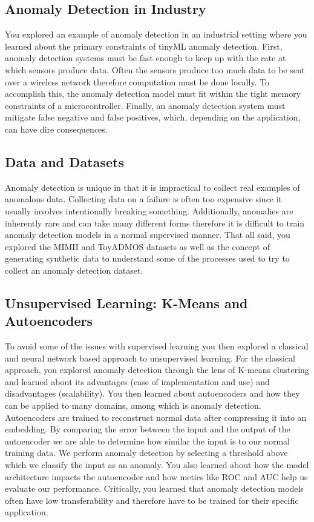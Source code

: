 \subsection{Anomaly Detection in Industry}

You explored an example of anomaly detection in an industrial setting where you learned about the primary constraints of tinyML anomaly detection. First, anomaly detection systems must be fast enough to keep up with the rate at which sensors produce data. Often the sensors produce too much data to be sent over a wireless network therefore computation must be done locally. To accomplish this, the anomaly detection model must fit within the tight memory constraints of a microcontroller. Finally, an anomaly detection system must mitigate false negative and false positives, which, depending on the application, can have dire consequences. 

\subsection{Data and Datasets}

Anomaly detection is unique in that it is impractical to collect real examples of anomalous data. Collecting data on a failure is often too expensive since it usually involves intentionally breaking something. Additionally, anomalies are inherently rare and can take many different forms therefore it is difficult to train anomaly detection models in a normal supervised manner. That all said, you explored the MIMII and ToyADMOS datasets as well as the concept of generating synthetic data to understand some of the processes used to try to collect an anomaly detection dataset.

\subsection{Unsupervised Learning: K-Means and Autoencoders}

To avoid some of the issues with supervised learning you then explored a classical and neural network based approach to unsupervised learning. For the classical approach, you explored anomaly detection through the lens of K-means clustering and learned about its advantages (ease of implementation and use) and disadvantages (scalability). You then learned about autoencoders and how they can be applied to many domains, among which is anomaly detection. Autoencoders are trained to reconstruct normal data after compressing it into an embedding. By comparing the error between the input and the output of the autoencoder we are able to determine how similar the input is to our normal training data. We perform anomaly detection by selecting a threshold above which we classify the input as an anomaly. You also learned about how the model architecture impacts the autoencoder and how metics like ROC and AUC help us evaluate our performance. Critically, you learned that anomaly detection models often have low transferability and therefore have to be trained for their specific application.  
  
